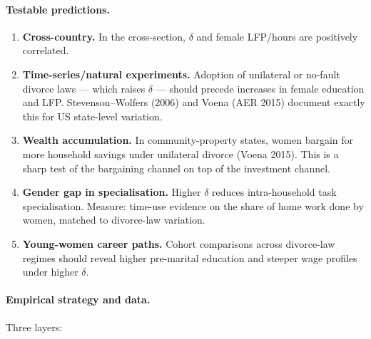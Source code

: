 \documentclass[11pt,a4paper]{article}
\begin{document}
\paragraph{Testable predictions.}
\begin{enumerate}[leftmargin=*,itemsep=2pt]
    \item \textbf{Cross-country.} In the cross-section, $\delta$ and female LFP/hours are positively correlated.
    \item \textbf{Time-series/natural experiments.} Adoption of unilateral or no-fault divorce laws --- which raises $\delta$ --- should precede increases in female education and LFP. Stevenson--Wolfers (2006) and Voena (AER 2015) document exactly this for US state-level variation.
    \item \textbf{Wealth accumulation.} In community-property states, women bargain for more household savings under unilateral divorce (Voena 2015). This is a sharp test of the bargaining channel on top of the investment channel.
    \item \textbf{Gender gap in specialisation.} Higher $\delta$ reduces intra-household task specialisation. Measure: time-use evidence on the share of home work done by women, matched to divorce-law variation.
    \item \textbf{Young-women career paths.} Cohort comparisons across divorce-law regimes should reveal higher pre-marital education and steeper wage profiles under higher $\delta$.
\end{enumerate}

\paragraph{Empirical strategy and data.}
Three layers:
\end{document}
